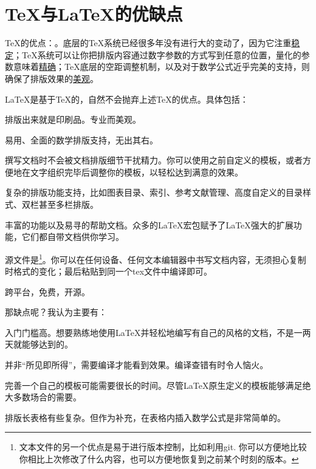 \section{\TeX 与\LaTeX 的优缺点}
\TeX 的优点：。底层的\TeX 系统已经很多年没有进行大的变动了，因为它注重\uline{稳定}；\TeX 系统可以让你把排版内容通过数字参数的方式写到任意的位置，量化的参数意味着\uline{精确}；\TeX 底层的空距调整机制，以及对于数学公式近乎完美的支持，则确保了排版效果的\uline{美观}。

\LaTeX 是基于\TeX 的，自然不会抛弃上述\TeX 的优点。具体包括：
\begin{feai}
\item 排版出来就是印刷品。专业而美观。
\item 易用、全面的数学排版支持，无出其右。
\item 撰写文档时不会被文档排版细节干扰精力。你可以使用之前自定义的模板，或者方便地在文字组织完毕后调整你的模板，以轻松达到满意的效果。
\item 复杂的排版功能支持，比如图表目录、索引、参考文献管理、高度自定义的目录样式、双栏甚至多栏排版。
\item 丰富的功能以及易寻的帮助文档。众多的\LaTeX 宏包赋予了\LaTeX 强大的扩展功能，它们都自带文档供你学习。
\item 源文件是\footnote{文本文件的另一个优点是易于进行版本控制，比如利用git. 你可以方便地比较你相比上次修改了什么内容，也可以方便地恢复到之前某个时刻的版本。}。你可以在任何设备、任何文本编辑器中书写文档内容，无须担心复制时格式的变化；最后粘贴到同一个tex文件中编译即可。
\item 跨平台，免费，开源。
\end{feai}

那缺点呢？我认为主要有：
\begin{feai}
\item 入门门槛高。想要熟练地使用\LaTeX 并轻松地编写有自己的风格的文档，不是一两天就能够达到的。
\item 并非“所见即所得”，需要编译才能看到效果。编译查错有时令人恼火。
\item 完善一个自己的模板可能需要很长的时间。尽管\LaTeX 原生定义的模板能够满足绝大多数场合的需要。
\item 排版长表格有些复杂。但作为补充，在表格内插入数学公式是非常简单的。
\end{feai}

